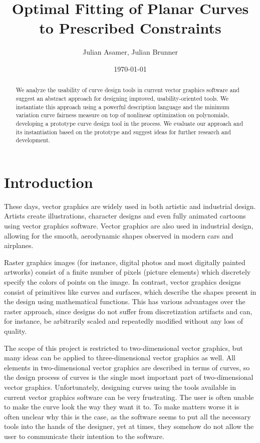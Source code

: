 \documentclass[a4paper]{article}
\title{Optimal Fitting of Planar Curves to Prescribed Constraints}
\author{Julian Asamer, Julian Brunner}
\date{\today}
\begin{document}
	\maketitle

	\begin{abstract}

		\noindent We analyze the usability of curve design tools in current vector graphics software and suggest an abstract approach for designing improved, usability-oriented tools. We instantiate this approach using a powerful description language and the minimum variation curve fairness measure on top of nonlinear optimization on polynomials, developing a prototype curve design tool in the process. We evaluate our approach and its instantiation based on the prototype and suggest ideas for further research and development.

	\end{abstract}

	\section{Introduction}
	\label{section:introduction}

		These days, vector graphics are widely used in both artistic and industrial design. Artists create illustrations, character designs and even fully animated cartoons using vector graphics software. Vector graphics are also used in industrial design, allowing for the smooth, aerodynamic shapes observed in modern cars and airplanes.

		Raster graphics images (for instance, digital photos and most digitally painted artworks) consist of a finite number of pixels (picture elements) which discretely specify the colors of points on the image. In contrast, vector graphics designs consist of primitives like curves and surfaces, which describe the shapes present in the design using mathematical functions. This has various advantages over the raster approach, since designs do not suffer from discretization artifacts and can, for instance, be arbitrarily scaled and repeatedly modified without any loss of quality.

		The scope of this project is restricted to two-dimensional vector graphics, but many ideas can be applied to three-dimensional vector graphics as well. All elements in two-dimensional vector graphics are described in terms of curves, so the design process of curves is the single most important part of two-dimensional vector graphics. Unfortunately, designing curves using the tools available in current vector graphics software can be very frustrating. The user is often unable to make the curve look the way they want it to. To make matters worse it is often unclear why this is the case, as the software seems to put all the necessary tools into the hands of the designer, yet at times, they somehow do not allow the user to communicate their intention to the software.
\end{document}
